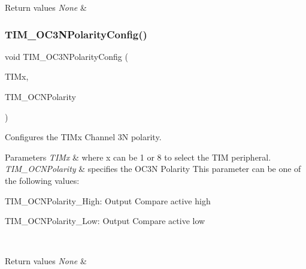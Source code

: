 \begin{DoxyRetVals}{Return values}
{\em None} & \\
\hline
\end{DoxyRetVals}
\mbox{\label{group___t_i_m___private___functions_gac710acc5b682e892584fc6f089f61dc2}} 
\subsubsection{\texorpdfstring{TIM\_OC3NPolarityConfig()}{TIM\_OC3NPolarityConfig()}}
{\footnotesize\ttfamily void T\+I\+M\+\_\+\+O\+C3\+N\+Polarity\+Config (\begin{DoxyParamCaption}\item[{\mbox{\hyperlink{struct_t_i_m___type_def}{T\+I\+M\+\_\+\+Type\+Def}} $\ast$}]{T\+I\+Mx,  }\item[{uint16\+\_\+t}]{T\+I\+M\+\_\+\+O\+C\+N\+Polarity }\end{DoxyParamCaption})}



Configures the T\+I\+Mx Channel 3N polarity. 


\begin{DoxyParams}{Parameters}
{\em T\+I\+Mx} & where x can be 1 or 8 to select the T\+IM peripheral. \\
\hline
{\em T\+I\+M\+\_\+\+O\+C\+N\+Polarity} & specifies the O\+C3N Polarity This parameter can be one of the following values\+: \begin{DoxyItemize}
\item T\+I\+M\+\_\+\+O\+C\+N\+Polarity\+\_\+\+High\+: Output Compare active high \item T\+I\+M\+\_\+\+O\+C\+N\+Polarity\+\_\+\+Low\+: Output Compare active low \end{DoxyItemize}
\\
\hline
\end{DoxyParams}

\begin{DoxyRetVals}{Return values}
{\em None} & \\
\hline
\end{DoxyRetVals}
\mbox{\label{group___t_i_m___private___functions_ga1ef43b03fe666495e80aac9741ae7ab0}} 
